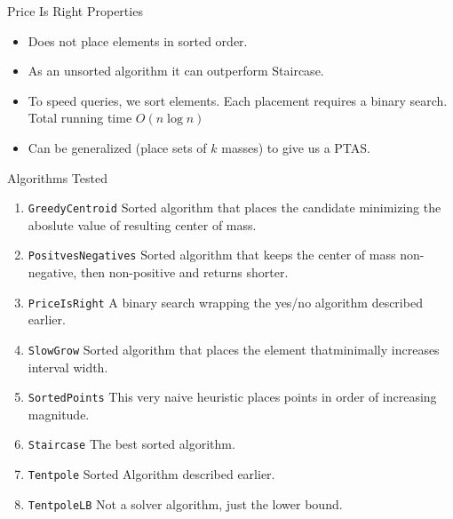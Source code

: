 \documentclass[compress,table]{beamer}
\begin{document}
\begin{frame}[t]{Price Is Right Properties}

\begin{itemize}
\item Does not place elements in sorted order.

\item As an unsorted algorithm it can outperform Staircase.

\item To speed queries, we sort elements. Each placement requires a binary search. Total running time $O(n \log n)$

\item Can be generalized (place sets of $k$ masses) to give us a PTAS.
\end{itemize}

\end{frame}

\begin{frame}[t]{Algorithms Tested}

\begin{enumerate}

\item \texttt{GreedyCentroid}
  Sorted algorithm that places the candidate minimizing the aboslute value of resulting center of mass. 

\item \texttt{PositvesNegatives} 
  Sorted algorithm that keeps the center of mass non-negative, then non-positive and returns shorter.

\item \texttt{PriceIsRight} A binary search wrapping the yes/no algorithm described earlier.

\item \texttt{SlowGrow}
Sorted algorithm that places the element thatminimally increases interval width.

\item \texttt{SortedPoints} This very naive heuristic places points in order of increasing magnitude.  

\item \texttt{Staircase} The best sorted algorithm.

\item \texttt{Tentpole} Sorted Algorithm described earlier.

\item \texttt{TentpoleLB} Not a solver algorithm, just the lower bound.

\end{enumerate}


\end{frame}
\end{document}
